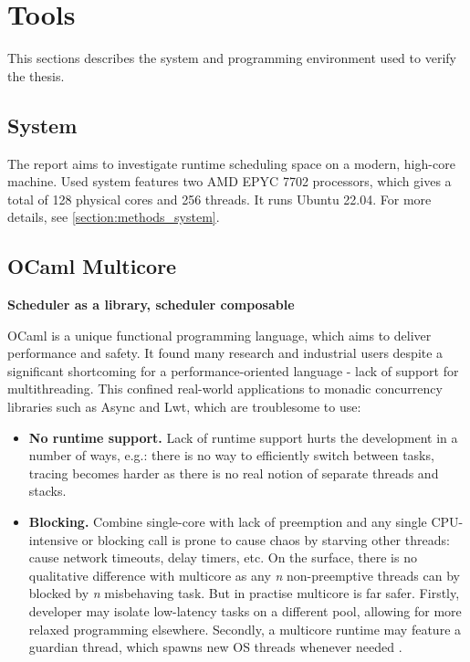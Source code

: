 \documentclass[12pt,a4paper,twoside]{report}
\begin{document}
\section{Tools}
This sections describes the system and programming environment used to verify the thesis. 

\subsection{System}
The report aims to investigate runtime scheduling space on a modern, high-core machine. Used system features two AMD EPYC 7702 processors, which gives a total of 128 physical cores and 256 threads. It runs Ubuntu 22.04. For more details, see \ref{section:methods_system}. 

\subsection{OCaml Multicore}

\textbf{Scheduler as a library, scheduler composable}
\label{section:intr_ocaml-multicore}

OCaml is a unique functional programming language, which aims to deliver performance and safety. It found many research and industrial users despite a significant shortcoming for a performance-oriented language - lack of support for multithreading. This confined real-world applications to monadic concurrency libraries such as Async and Lwt, which are troublesome to use: 
\begin{itemize}
    \item \textbf{No runtime support.} Lack of runtime support hurts the development in a number of ways, e.g.: there is no way to efficiently switch between tasks, tracing becomes harder as there is no real notion of separate threads and stacks. 
    \item \textbf{Blocking.} Combine single-core with lack of preemption and any single CPU-intensive or blocking call is prone to cause chaos by starving other threads: cause network timeouts, delay timers, etc. On the surface, there is no qualitative difference with multicore as any \textit{n} non-preemptive threads can by blocked by \textit{n} misbehaving task. But in practise multicore is far safer. Firstly, developer may isolate low-latency tasks on a different pool, allowing for more relaxed programming elsewhere. Secondly, a multicore runtime may feature a guardian thread, which spawns new OS threads whenever needed \cite{golang}.
\end{itemize}
\end{document}
